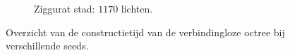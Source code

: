 \begin{figure}[p]
\begin{adjustbox}{minipage=\textwidth, scale=0.6}
\begin{subfigure}[b]{0.83\textwidth}
    \end{subfigure}
  \end{adjustbox} %
  \begin{adjustbox}{minipage=\textwidth, scale=0.6}
    \begin{subfigure}[b]{0.83\textwidth}
      \centering
      \def\svgwidth{\textwidth}
      
      \caption{Ziggurat stad: $1170$ lichten.}
      \label{fig:hs-seed-construction-time::zc-high}
    \end{subfigure}
  \end{adjustbox}
  \caption{Overzicht van de constructietijd van de verbindingloze octree
           bij verschillende seeds.}
  \label{fig:hs-seed-construction-time}
\end{figure}

